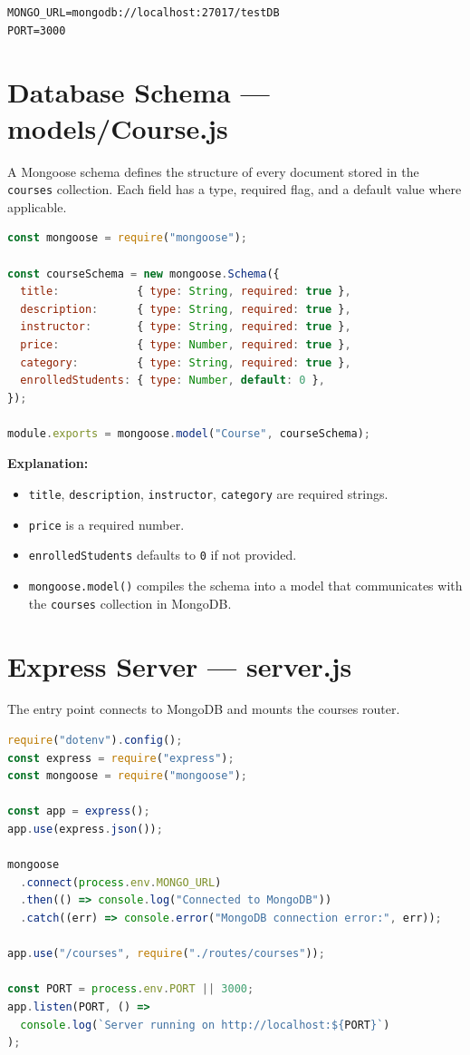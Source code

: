 \documentclass[12pt,a4paper]{article}
\begin{document}
\begin{lstlisting}
MONGO_URL=mongodb://localhost:27017/testDB
PORT=3000
\end{lstlisting}

\section{Database Schema --- models/Course.js}
A Mongoose schema defines the structure of every document stored in the \texttt{courses} collection. Each field has a type, required flag, and a default value where applicable.

\begin{lstlisting}[language=JavaScript]
const mongoose = require("mongoose");

const courseSchema = new mongoose.Schema({
  title:            { type: String, required: true },
  description:      { type: String, required: true },
  instructor:       { type: String, required: true },
  price:            { type: Number, required: true },
  category:         { type: String, required: true },
  enrolledStudents: { type: Number, default: 0 },
});

module.exports = mongoose.model("Course", courseSchema);
\end{lstlisting}

\textbf{Explanation:}
\begin{itemize}
  \item \texttt{title}, \texttt{description}, \texttt{instructor}, \texttt{category} are required strings.
  \item \texttt{price} is a required number.
  \item \texttt{enrolledStudents} defaults to \texttt{0} if not provided.
  \item \texttt{mongoose.model()} compiles the schema into a model that communicates with the \texttt{courses} collection in MongoDB.
\end{itemize}

\section{Express Server --- server.js}
The entry point connects to MongoDB and mounts the courses router.

\begin{lstlisting}[language=JavaScript]
require("dotenv").config();
const express = require("express");
const mongoose = require("mongoose");

const app = express();
app.use(express.json());

mongoose
  .connect(process.env.MONGO_URL)
  .then(() => console.log("Connected to MongoDB"))
  .catch((err) => console.error("MongoDB connection error:", err));

app.use("/courses", require("./routes/courses"));

const PORT = process.env.PORT || 3000;
app.listen(PORT, () =>
  console.log(`Server running on http://localhost:${PORT}`)
);
\end{lstlisting}
\end{document}
